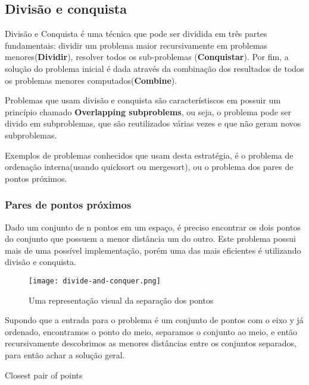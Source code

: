\subsection{Divisão e conquista}

    Divisão e Conquista é uma técnica que pode ser dividida em três 
    partes fundamentais: dividir um problema maior recursivamente em 
    problemas menores(\textbf{Dividir}), resolver todos os 
    sub-problemas (\textbf{Conquistar}). Por fim, a solução do problema inicial 
    é dada através da combinação dos resultados de todos os problemas 
    menores computados(\textbf{Combine}). 

    Problemas que usam divisão e conquista são característiscos em possuir um princípio 
    chamado \textbf{Overlapping subproblems}, ou seja, o problema pode ser divido em 
    subproblemas, que são reutilizados várias vezes e que não geram novos subproblemas.
    
    Exemplos de problemas conhecidos que usam desta estratégia, é o problema de 
    ordenação interna(usando quicksort ou mergesort), ou o problema dos pares de pontos próximos.

\subsubsection{Pares de pontos próximos}

    Dado um conjunto de n pontos em um espaço, é preciso encontrar os dois pontos do conjunto que possuem a 
    menor distância um do outro. Este problema possui mais de uma possível implementação, porém 
    uma das mais eficientes é utilizando divisão e conquista.

    \begin{figure}[ht]
        \centering
        \texttt{[image: divide-and-conquer.png]}
        \caption{Uma representação visual da separação dos pontos}
        \label{fig:divide-and-conquer}
    \end{figure}

    Supondo que a entrada para o problema é um conjunto de pontos com o eixo y já ordenado,
    encontramos o ponto do meio, separamos o conjunto ao meio, e então recursivamente descobrimos
    as menores distâncias entre os conjuntos separados, para então achar a solução geral.

    \newpage 

    \begin{algorithm}
        \caption{Closest pair of points} 
        \begin{algorithmic}[1]
        \EndIf
        \EndProcedure
        \end{algorithmic}
      \end{algorithm}

